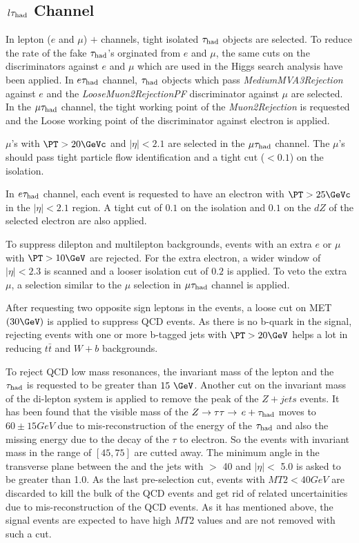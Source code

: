 \subsection{\texorpdfstring{$\,l\tau_{\rm had}$ Channel}{lepton-tau Channel}}
\label{sect:leptonTauCuts}
In lepton ($e$ and $\mu$) $+$ \Tau channels, tight isolated $\tau_{\rm had}$ objects are selected. To reduce the rate of the fake $\tau_{\rm had}$'s orginated from $e$ and $\mu$, the same cuts on the discriminators against $e$ and $\mu$ which are used in the Higgs search analysis \cite{CMS_AN_2013-188} have been applied. In $e\tau_{\rm had}$ channel, $\tau_{\rm had}$ objects which pass \emph{MediumMVA3Rejection} against $e$ and the \emph{LooseMuon2RejectionPF} discriminator against $\mu$ are selected. In the $\mu\tau_{\rm had}$ channel, the tight working point of the \emph{Muon2Rejection} is requested and the Loose working point of the discriminator against electron is applied.

$\mu$'s with $\PT > 20 \GeVc$ and $|\eta|<2.1$ are selected in the $\mu\tau_{\rm had}$ channel. The $\mu$'s should pass tight particle flow identification and a tight cut ($<0.1$) on the isolation.
 
In $e\tau_{\rm had}$ channel, each event is requested to have an electron with $\PT >25 \GeVc$ in the $|\eta| < 2.1 $ region. A tight cut of $0.1$ on the isolation and $0.1$ on the $dZ$ of the selected electron are also applied.

To suppress dilepton and multilepton backgrounds, events with an extra $e$ or $\mu$ with $\PT >10 \GeV$ are rejected. For the extra electron, a wider window of $|\eta|<2.3$ is scanned and a looser isolation cut of $0.2$ is applied. To veto the extra $\mu$, a selection similar to the $\mu$ selection in $\mu\tau_{\rm had}$ channel is applied.

After requesting two opposite sign leptons in the events, a loose cut on MET $(30 \GeV)$ is applied to suppress QCD events. As there is no b-quark in the signal, rejecting events with one or more b-tagged jets with $\PT > 20 \GeV$ helps a lot in reducing $t\bar{t}$ and $W+b$ backgrounds.

To reject QCD low mass resonances, the invariant mass of the lepton and the $\tau_{\rm had}$ is requested to be greater than $15\ \GeV$. Another cut on the invariant mass of the di-lepton system is applied to remove the peak of the $Z+jets$ events. It has been found that the visible mass of the $Z\to\tau\tau\to\,e +\tau_{\rm had}$ moves to $60 \pm 15 GeV$ due to mis-reconstruction of the energy of the $\tau_{\rm had}$ and also the missing energy due to the decay of the $\tau$ to electron. So the events with invariant mass in the range of $[45,75]$ are cutted away. The minimum angle in the transverse plane between the \MET and the jets with \PT $>$ 40 \GeVc and $|\eta| <$ 5.0 is asked to be greater than 1.0. As the last pre-selection cut, events with $MT2<40 GeV$ are discarded to kill the bulk of the QCD events and get rid of related uncertainities due to mis-reconstruction of the QCD events. As it has mentioned above, the signal events are expected to have high $MT2$ values and are not removed with such a cut.

